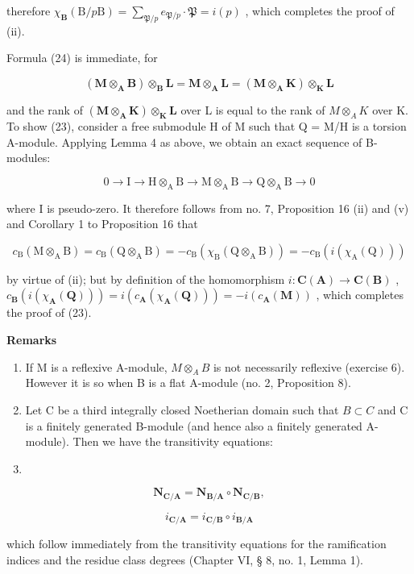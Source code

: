 therefore \(\chi_{\mathbf{B}}(\mathrm{B} / p\mathrm{B}) = \sum_{\mathfrak{P} / p}e_{\mathfrak{P} / p}\cdot \mathfrak{P} = i(p)\) , which completes the proof of (ii).

Formula (24) is immediate, for

\[
(\mathbf {M} \otimes_ {\mathbf {A}} \mathbf {B}) \otimes_ {\mathbf {B}} \mathbf {L} = \mathbf {M} \otimes_ {\mathbf {A}} \mathbf {L} = (\mathbf {M} \otimes_ {\mathbf {A}} \mathbf {K}) \otimes_ {\mathbf {K}} \mathbf {L}
\]

and the rank of \((\mathbf{M} \otimes_{\mathbf{A}} \mathbf{K}) \otimes_{\mathbf{K}} \mathbf{L}\) over L is equal to the rank of \(M \otimes_{A} K\) over K. To show (23), consider a free submodule H of M such that Q = M/H is a torsion A-module. Applying Lemma 4 as above, we obtain an exact sequence of B-modules:

\[
0 \rightarrow \mathrm{I} \rightarrow \mathrm{H} \otimes_ {\mathrm{A}} \mathrm{B} \rightarrow \mathrm{M} \otimes_ {\mathrm{A}} \mathrm{B} \rightarrow \mathrm{Q} \otimes_ {\mathrm{A}} \mathrm{B} \rightarrow 0
\]

where I is pseudo-zero. It therefore follows from no. 7, Proposition 16 (ii) and (v) and Corollary 1 to Proposition 16 that

\[
c _ {\mathrm{B}} (\mathrm{M} \otimes_ {\mathrm{A}} \mathrm{B}) = c _ {\mathrm{B}} (\mathrm{Q} \otimes_ {\mathrm{A}} \mathrm{B}) = - c _ {\mathrm{B}} \left(\chi_ {\mathrm{B}} (\mathrm{Q} \otimes_ {\mathrm{A}} \mathrm{B})\right) = - c _ {\mathrm{B}} (i \left(\chi_ {\mathrm{A}} (\mathrm{Q})\right))
\]

by virtue of (ii); but by definition of the homomorphism \(i: \mathbf{C}(\mathbf{A}) \to \mathbf{C}(\mathbf{B})\) , \(c_{\mathbf{B}}(i(\chi_{\mathbf{A}}(\mathbf{Q}))) = i(c_{\mathbf{A}}(\chi_{\mathbf{A}}(\mathbf{Q}))) = -i(c_{\mathbf{A}}(\mathbf{M}))\) , which completes the proof of (23).

\textbf{Remarks}\par

\begin{enumerate}
\def\labelenumi{(\arabic{enumi})}
\item
  If M is a reflexive A-module, \(M \otimes_{A} B\) is not necessarily reflexive (exercise 6). However it is so when B is a flat A-module (no. 2, Proposition 8).
\item
  Let C be a third integrally closed Noetherian domain such that \(B \subset C\) and C is a finitely generated B-module (and hence also a finitely generated A-module). Then we have the transitivity equations:
\item
\end{enumerate}

\[
\mathbf {N} _ {\mathbf {C} / \mathbf {A}} = \mathbf {N} _ {\mathbf {B} / \mathbf {A}} \circ \mathbf {N} _ {\mathbf {C} / \mathbf {B}},\tag{26}
\]

\[
i _ {\mathbf {C} / \mathbf {A}} = i _ {\mathbf {C} / \mathbf {B}} \circ i _ {\mathbf {B} / \mathbf {A}}
\]

which follow immediately from the transitivity equations for the ramification indices and the residue class degrees (Chapter VI, § 8, no. 1, Lemma 1).

